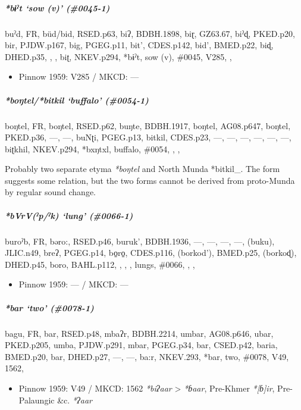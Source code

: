 \documentclass[a4paper,]{article}
\providecommand{\tightlist}{%
  \setlength{\itemsep}{0pt}\setlength{\parskip}{0pt}}
\let\oldsubparagraph\subparagraph
\renewcommand{\subparagraph}[1]{\oldsubparagraph{#1}\mbox{}}
\begin{document}
\subparagraph{\texorpdfstring{\emph{*bɨˀt} `sow (v)'
(\#0045-1)}{*bɨˀt sow (v) (\#0045-1)}}\label{bux268ux2c0t-sow-v-0045-1}

buˀd, FR, büd/bid, RSED.p63, biʔ, BDBH.1898, biɽ, GZ63.67, biˀɖ,
PKED.p20, bir, PJDW.p167, big, PGEG.p11, bit', CDES.p142, bid',
BMED.p22, biɖ, DHED.p35, , , biʈ, NKEV.p294, *bɨˀt, sow (v), \#0045,
V285, ,

\begin{itemize}
\tightlist
\item
  Pinnow 1959: V285 / MKCD: ---
\end{itemize}

\subparagraph{\texorpdfstring{\emph{*boŋtel}/\emph{*bitkil} `buffalo'
(\#0054-1)}{*boŋtel/*bitkil buffalo (\#0054-1)}}\label{boux14btelbitkil-buffalo-0054-1}

boŋtel, FR, boŋtel, RSED.p62, buŋte, BDBH.1917, boŋtel, AG08.p647,
boŋtel, PKED.p36, ---, ---, buNʈi, PGEG.p13, bitkil, CDES.p23, ---, ---,
---, ---, ---, ---, biʈkhil, NKEV.p294, *bxŋtxl, buffalo, \#0054, , ,

Probably two separate etyma \emph{*boŋtel} and North Munda *bitkil\_.
The form suggests some relation, but the two forms cannot be derived
from proto-Munda by regular sound change.

\subparagraph{\texorpdfstring{\emph{*bVrV(ˀp/ˀk)} `lung'
(\#0066-1)}{*bVrV(ˀp/ˀk) lung (\#0066-1)}}\label{bvrvux2c0pux2c0k-lung-0066-1}

buroˀb, FR, bəro:, RSED.p46, buruk', BDBH.1936, ---, ---, ---, ---,
(buku), JLIC.n49, breʔ, PGEG.p14, bo̠ro̠, CDES.p116, (borkod'), BMED.p25,
(borkoɖ), DHED.p45, boro, BAHL.p112, , , , lungs, \#0066, , ,

\begin{itemize}
\tightlist
\item
  Pinnow 1959: --- / MKCD: ---
\end{itemize}

\subparagraph{\texorpdfstring{\emph{*bar} `two'
(\#0078-1)}{*bar two (\#0078-1)}}\label{bar-two-0078-1}

bagu, FR, bar, RSED.p48, mbaʔr, BDBH.2214, umbar, AG08.p646, ubar,
PKED.p205, umba, PJDW.p291, mbar, PGEG.p34, bar, CSED.p42, baria,
BMED.p20, bar, DHED.p27, ---, ---, ba:r, NKEV.293, *bar, two, \#0078,
V49, 1562,

\begin{itemize}
\tightlist
\item
  Pinnow 1959: V49 / MKCD: 1562 \emph{*biʔaar} \textgreater{}
  \emph{*ɓaar}, Pre-Khmer \emph{*{[}ɓ{]}ir}, Pre-Palaungic \&c.
  \emph{*ʔaar}
\end{itemize}
\end{document}
